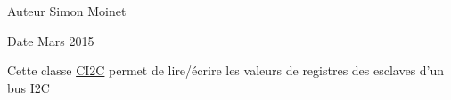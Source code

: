 \begin{DoxyAuthor}{Auteur}
Simon Moinet 
\end{DoxyAuthor}
\begin{DoxyDate}{Date}
Mars 2015
\end{DoxyDate}
Cette classe \hyperlink{classCI2C}{C\+I2\+C} permet de lire/écrire les valeurs de registres des esclaves d'un bus I2\+C 
